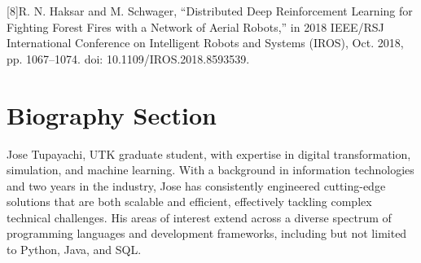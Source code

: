 \documentclass[lettersize,journal]{IEEEtran}
\begin{document}
[8]R. N. Haksar and M. Schwager, “Distributed Deep Reinforcement Learning for Fighting Forest Fires with a Network of Aerial Robots,” in 2018 IEEE/RSJ International Conference on Intelligent Robots and Systems (IROS), Oct. 2018, pp. 1067–1074. doi: 10.1109/IROS.2018.8593539.



\newpage

\section{Biography Section}
 
\vspace{11pt}

\begin{IEEEbiography}{Jose Tupayachi}, UTK graduate student, with expertise  in digital transformation, simulation, and machine learning. With a background in information technologies and two years in the industry, Jose has consistently engineered cutting-edge solutions that are both scalable and efficient, effectively tackling complex technical challenges. His areas of interest extend across a diverse spectrum of programming languages and development frameworks, including but not limited to Python, Java, and SQL.
\end{IEEEbiography}

\vspace{11pt}

\end{document}
